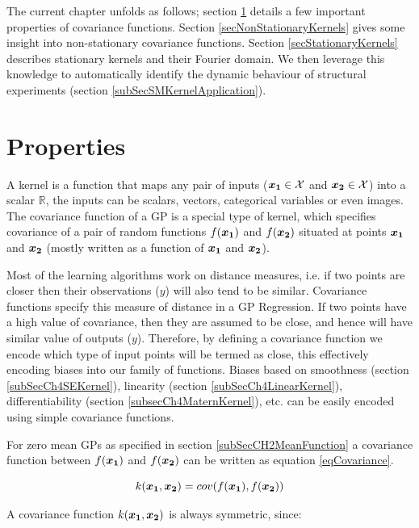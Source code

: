 The current chapter unfolds as follows; section \ref{secPropertiesOfCovariance} details a few important properties of covariance functions. Section \ref{secNonStationaryKernels} gives some insight into non-stationary covariance functions. Section \ref{secStationaryKernels} describes stationary kernels and their Fourier domain. We then leverage this knowledge to automatically identify the dynamic behaviour of structural experiments (section \ref{subSecSMKernelApplication}). 

\section{Properties}\label{secPropertiesOfCovariance}
A kernel is a function that maps any pair of inputs ($\boldsymbol{x_1} \in \mathcal{X}$ and $\boldsymbol{x_2} \in \mathcal{X}$) into a scalar $\mathbb{R}$, the inputs can be scalars, vectors, categorical variables \cite{villegas2013investigation} or even images. The covariance function of a GP is a special type of kernel, which specifies covariance of a pair of random functions $f(\boldsymbol{x_{1}})$ and $f(\boldsymbol{x_{2}})$ situated at points $\boldsymbol{x_{1}}$ and $\boldsymbol{x_{2}}$ (mostly written as a function of $\boldsymbol{x_{1}}$ and $\boldsymbol{x_{2}}$). 

Most of the learning algorithms work on distance measures, i.e. if two points are closer then their observations ($y$) will also tend to be similar. Covariance functions specify this measure of distance in a GP Regression. If two points have a high value of covariance, then they are assumed to be close, and hence will have similar value of outputs ($y$). Therefore, by defining a covariance function we encode which type of input points will be termed as close, this effectively encoding biases into our family of functions. Biases based on smoothness (section \ref{subSecCh4SEKernel}), linearity (section \ref{subSecCh4LinearKernel}), differentiability (section \ref{subsecCh4MaternKernel}), etc. can be easily encoded using simple covariance functions.

For zero mean GPs as specified in section \ref{subSecCH2MeanFunction} a covariance function between $f(\boldsymbol{x_{1}})$ and $f(\boldsymbol{x_{2}})$ can be written as equation \ref{eqCovariance}.

\begin{equation}\label{eqCovariance}
    k(\boldsymbol{x_{1}}, \boldsymbol{x_{2}}) = cov(f(\boldsymbol{x_{1}}), f(\boldsymbol{x_{2}}))
\end{equation}

A covariance function $k(\boldsymbol{x_{1}}, \boldsymbol{x_{2}})$ is always symmetric, since: 

